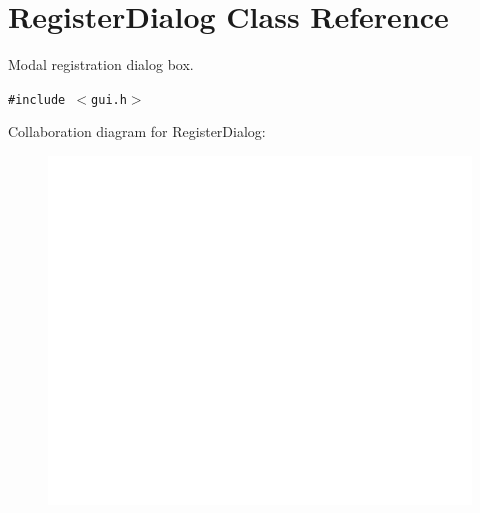 \hypertarget{classRegisterDialog}{
\section{RegisterDialog Class Reference}
\label{classRegisterDialog}
}
Modal registration dialog box.  


{\tt \#include $<$gui.h$>$}

Collaboration diagram for RegisterDialog:\nopagebreak
\begin{figure}[H]
\begin{center}
\leavevmode
\includegraphics[width=400pt]{classRegisterDialog__coll__graph}
\end{center}
\end{figure}

